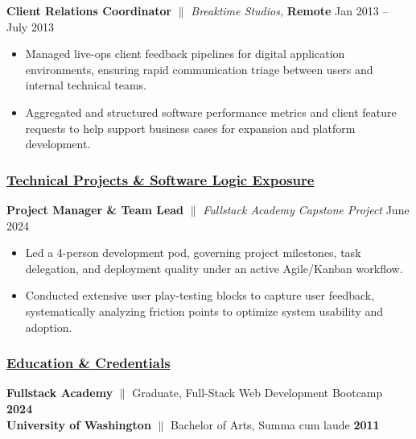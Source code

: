 \documentclass[a4paper,10pt]{article}
\begin{document}
\vspace{1.5mm}
{\textbf{Client Relations Coordinator} $\parallel$ \textit{Breaktime Studios,}  \textbf{Remote} \hfill {Jan 2013 – July 2013}}
\begin{itemize}
      \item Managed live-ops client feedback pipelines for digital application environments, ensuring rapid communication triage between users and internal technical teams.
      \item Aggregated and structured software performance metrics and client feature requests to help support business cases for expansion and platform development.
\end{itemize}

\subsubsection{\underline{Technical Projects \& Software Logic Exposure}}

{\textbf{Project Manager \& Team Lead} $\parallel$ \textit{Fullstack Academy Capstone Project} \hfill {June 2024}}
\begin{itemize}
      \item Led a 4-person development pod, governing project milestones, task delegation, and deployment quality under an active Agile/Kanban workflow.
      \item Conducted extensive user play-testing blocks to capture user feedback, systematically analyzing friction points to optimize system usability and adoption.
\end{itemize}

\subsubsection{\underline{Education \& Credentials}}
\textbf{Fullstack Academy} $\parallel$ Graduate, Full-Stack Web Development Bootcamp \hfill \textbf{2024} \\
\textbf{University of Washington} $\parallel$ Bachelor of Arts, Summa cum laude \hfill \textbf{2011}
\end{document}
